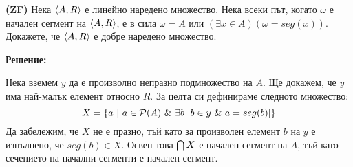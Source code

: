 \begin{problem}
\textbf{(ZF)}
Нека $\langle A, R \rangle$ е линейно наредено множество.
Нека всеки път, когато $\omega$ е начален сегмент на $\langle A, R \rangle$, е в сила
$\omega = A$ или $(\exists x \in A)(\omega = seg(x))$.
Докажете, че $\langle A, R \rangle$ е добре наредено множество.
\end{problem}

\textbf{Решение:}

\smallbreak
\quad
Нека вземем $y$ да е произволно непразно подмножество на $A$.
Ще докажем, че $y$ има най-малък елемент относно $R$.
За целта си дефинираме следното множество:
\[
X = \{ a\ |\ a \in \mathcal{P}(A) \ \&\  \exists b\ [ b \in y \ \&\   a = seg(b)] \}
\]
\quad
Да забележим, че $X$ не е празно, тъй като за произволен елемент $b$ на $y$ е изпълнено, че $seg(b) \in X$.
Освен това $\bigcap X$ е начален сегмент на $A$, тъй като сечението на начални сегменти е начален сегмент.

